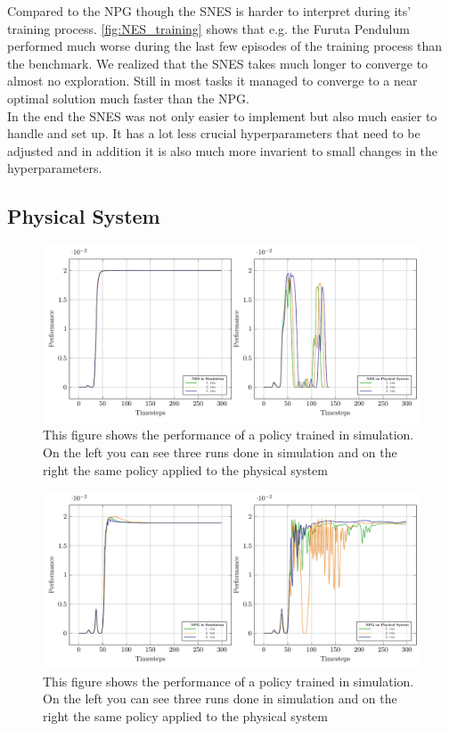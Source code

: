 Compared to the NPG though the SNES is harder to interpret during its' training process. \autoref{fig:NES_training} shows that e.g. the Furuta Pendulum performed much worse during the last few episodes of the training process than the benchmark. We realized that the SNES takes much longer to converge to almost no exploration. Still in most tasks it managed to converge to a near optimal solution much faster than the NPG. \\

In the end the SNES was not only easier to implement but also much easier to handle and set up. It has a lot less crucial hyperparameters that need to be adjusted and in addition it is also much more invarient to small changes in the hyperparameters.

\subsection{Physical System}
\label{phys}

\begin{figure}[ht]
\centering
\includegraphics[scale=.6]{plots/benchmark_Qube_NES_plattforms_working.pdf}
\caption{This figure shows the performance of a policy trained in simulation. On the left you can see three runs done in simulation and on the right the same policy applied to the physical system}
\label{fig:NES_sim_to_pyhs}
\end{figure}

\begin{figure}[ht]
\centering
\includegraphics[scale=.6]{plots/benchmark_Qube_NPG_plattforms_working.pdf}
\caption{This figure shows the performance of a policy trained in simulation. On the left you can see three runs done in simulation and on the right the same policy applied to the physical system}
\label{fig:NPG_sim_to_pyhs}
\end{figure}
